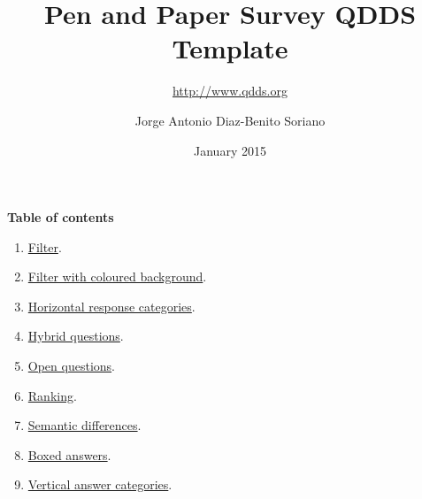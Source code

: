 \documentclass[12pt,fleqn]{scrreprt}
\title{Pen and Paper Survey QDDS Template}
\subtitle{\url{http://www.qdds.org}}
\author{Jorge Antonio Diaz-Benito Soriano}
\date{January 2015}
\begin{document}
\maketitle

\newpage
{}
\setcounter{page}{1}
\textbf{Table of contents}
\begin{enumerate}
\item \hyperref[Filter]{Filter}.
\item \hyperref[Filter with coloured background]{Filter with coloured background}.
\item \hyperref[Horizontal response categories]{Horizontal response categories}.
\item \hyperref[Hybrid questions]{Hybrid questions}.
\item \hyperref[Open questions]{Open questions}.
\item \hyperref[Ranking]{Ranking}.
\item \hyperref[Semantic differences]{Semantic differences}.
\item \hyperref[Boxed answers]{Boxed answers}.
\item \hyperref[Vertical answer categories]{Vertical answer categories}.
\end{enumerate}

\newpage
{}	
\setcounter{page}{1}










\end{document}

